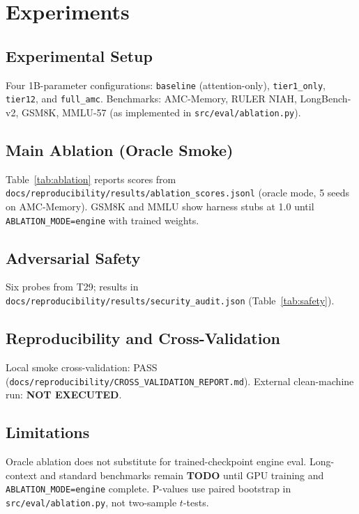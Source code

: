 \section{Experiments}
\label{sec:experiments}


\subsection{Experimental Setup}

Four 1B-parameter configurations: \texttt{baseline} (attention-only),
\texttt{tier1\_only}, \texttt{tier12}, and \texttt{full\_amc}.
Benchmarks: AMC-Memory, RULER NIAH, LongBench-v2, GSM8K, MMLU-57
(as implemented in \texttt{src/eval/ablation.py}).

\subsection{Main Ablation (Oracle Smoke)}

Table~\ref{tab:ablation} reports scores from
\texttt{docs/reproducibility/results/ablation\_scores.jsonl}
(oracle mode, 5 seeds on AMC-Memory). GSM8K and MMLU show harness
stubs at 1.0 until \texttt{ABLATION\_MODE=engine} with trained weights.



\subsection{Adversarial Safety}

Six probes from T29; results in
\texttt{docs/reproducibility/results/security\_audit.json}
(Table~\ref{tab:safety}).



\subsection{Reproducibility and Cross-Validation}

Local smoke cross-validation: PASS
(\texttt{docs/reproducibility/CROSS\_VALIDATION\_REPORT.md}).
External clean-machine run: \textbf{NOT EXECUTED}.

\subsection{Limitations}

Oracle ablation does not substitute for trained-checkpoint engine eval.
Long-context and standard benchmarks remain \textbf{TODO} until GPU training
and \texttt{ABLATION\_MODE=engine} complete.
P-values use paired bootstrap in \texttt{src/eval/ablation.py}, not
two-sample $t$-tests.
